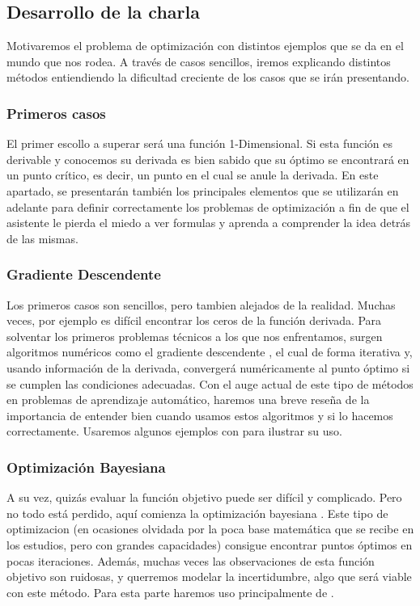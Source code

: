 \documentclass[runningheads]{llncs}
\begin{document}
\subsection{Desarrollo de la charla}
Motivaremos el problema de optimización con distintos ejemplos que se da en el mundo que nos rodea. A través de casos sencillos, iremos explicando distintos métodos entiendiendo la dificultad creciente de los casos que se irán presentando. 

\subsubsection{Primeros casos}
El primer escollo a superar será una función 1-Dimensional. Si esta función es derivable y conocemos su derivada es bien sabido que su óptimo se encontrará en un punto crítico, es decir, un punto en el cual se anule la derivada. En este apartado, se presentarán también los principales elementos que se utilizarán en adelante \cite{bonnans2006numerical} para definir correctamente los problemas de optimización a fin de que el asistente le pierda el miedo a ver formulas y aprenda a comprender la idea detrás de las mismas.

\subsubsection{Gradiente Descendente}
Los primeros casos son sencillos, pero tambien alejados de la realidad. Muchas veces, por ejemplo es difícil encontrar los ceros de la función derivada. Para solventar los primeros problemas técnicos a los que nos enfrentamos, surgen algoritmos numéricos como el gradiente descendente \cite{ruder2016overview}, el cual de forma iterativa y, usando información de la derivada, convergerá numéricamente al punto óptimo si se cumplen las condiciones adecuadas. Con el auge actual de este tipo de métodos en problemas de aprendizaje automático, haremos una breve reseña de la importancia de entender bien cuando usamos estos algoritmos y si lo hacemos correctamente. Usaremos algunos ejemplos con \cite{scikit-learn} para ilustrar su uso.

\subsubsection{Optimización Bayesiana}
A su vez, quizás evaluar la función objetivo puede ser difícil y complicado. Pero no todo está perdido, aquí comienza la optimización bayesiana \cite{lizotte2008practical}. Este tipo de optimizacion (en ocasiones olvidada por la poca base matemática que se recibe en los estudios, pero con grandes capacidades\cite{snoek2012practical}) consigue encontrar puntos óptimos en pocas iteraciones. Además, muchas veces las observaciones de esta función objetivo son ruidosas, y querremos modelar la incertidumbre, algo que será viable con este método. Para esta parte haremos uso principalmente de \cite{gpyopt2016}.
\end{document}
